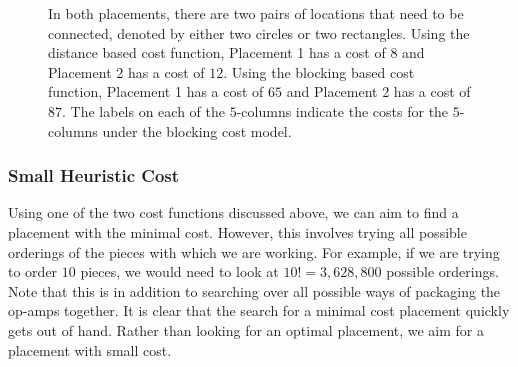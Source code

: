 \begin{figure}[H]
\centering
{}
\caption[Placement cost function examples]{In both placements, there are two
pairs of locations that need to be connected, denoted by either two circles or
two rectangles. Using the distance based cost function, Placement 1 has a cost of
$8$ and Placement 2 has a cost of $12$. Using the blocking based cost function,
Placement 1 has a cost of $65$ and Placement 2 has a cost of $87$. The labels
on each of the $5$-columns indicate the costs for the $5$-columns under the
blocking cost model.}
\label{fig:placement_costs}
\end{figure}

\subsubsection{Small Heuristic Cost}

Using one of the two cost functions discussed above, we can aim to find a
placement with the minimal cost. However, this involves trying all possible
orderings of the pieces with which we are working. For example, if we are trying
to order $10$ pieces, we would need to look at $10! = 3,628,800$ possible
orderings. Note that this is in addition to
searching over all possible ways
of packaging the op-amps together. It is clear that the search for a
minimal cost placement quickly gets out of hand.
Rather than looking for an optimal placement, we aim for a placement with small
cost.

